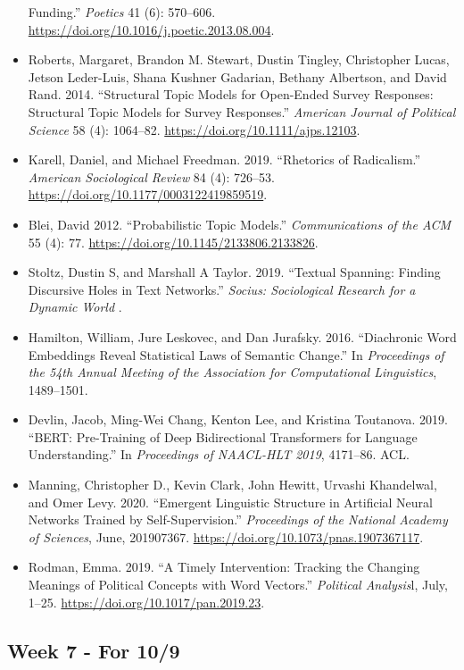 \documentclass[
  10pt,
]{article}
\begin{document}
\begin{itemize}
  Funding.'' \emph{Poetics} 41 (6): 570--606.
  \url{https://doi.org/10.1016/j.poetic.2013.08.004}.
\item
  Roberts, Margaret, Brandon M. Stewart, Dustin Tingley, Christopher
  Lucas, Jetson Leder-Luis, Shana Kushner Gadarian, Bethany Albertson,
  and David Rand. 2014. ``Structural Topic Models for Open-Ended Survey
  Responses: Structural Topic Models for Survey Responses.''
  \emph{American Journal of Political Science} 58 (4): 1064--82.
  \url{https://doi.org/10.1111/ajps.12103}.
\item
  Karell, Daniel, and Michael Freedman. 2019. ``Rhetorics of
  Radicalism.'' \emph{American Sociological Review} 84 (4): 726--53.
  \url{https://doi.org/10.1177/0003122419859519}.
\item
  Blei, David 2012. ``Probabilistic Topic Models.'' \emph{Communications
  of the ACM} 55 (4): 77. \url{https://doi.org/10.1145/2133806.2133826}.
\item
  Stoltz, Dustin S, and Marshall A Taylor. 2019. ``Textual Spanning:
  Finding Discursive Holes in Text Networks.'' \emph{Socius:
  Sociological Research for a Dynamic World} .
\item
  Hamilton, William, Jure Leskovec, and Dan Jurafsky. 2016. ``Diachronic
  Word Embeddings Reveal Statistical Laws of Semantic Change.'' In
  \emph{Proceedings of the 54th Annual Meeting of the Association for
  Computational Linguistics}, 1489--1501.
\item
  Devlin, Jacob, Ming-Wei Chang, Kenton Lee, and Kristina Toutanova.
  2019. ``BERT: Pre-Training of Deep Bidirectional Transformers for
  Language Understanding.'' In \emph{Proceedings of NAACL-HLT 2019},
  4171--86. ACL.
\item
  Manning, Christopher D., Kevin Clark, John Hewitt, Urvashi Khandelwal,
  and Omer Levy. 2020. ``Emergent Linguistic Structure in Artificial
  Neural Networks Trained by Self-Supervision.'' \emph{Proceedings of
  the National Academy of Sciences}, June, 201907367.
  \url{https://doi.org/10.1073/pnas.1907367117}.
\item
  Rodman, Emma. 2019. ``A Timely Intervention: Tracking the Changing
  Meanings of Political Concepts with Word Vectors.'' \emph{Political
  Analysis}l, July, 1--25. \url{https://doi.org/10.1017/pan.2019.23}.
\end{itemize}

\hypertarget{week-7---for-109}{%
\subsection{Week 7 - For 10/9}\label{week-7---for-109}}
\end{document}
